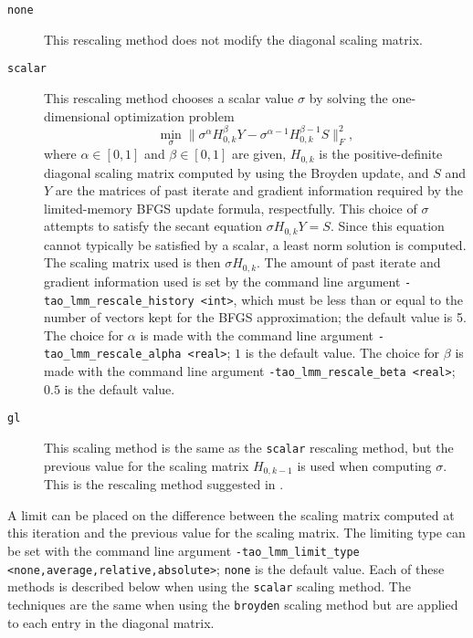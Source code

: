 \begin{description}
\item[{\tt none}] This rescaling method does not modify the diagonal scaling
matrix.
\item[{\tt scalar}] This rescaling method chooses a scalar value $\sigma$ by 
solving the one-dimensional optimization problem
\[
\min_\sigma \|\sigma^\alpha H_{0,k}^{\beta} Y - \sigma^{\alpha - 1} H_{0,k}^{\beta - 1} S\|_F^2,
\]
where $\alpha \in [0,1]$ and $\beta \in [0,1]$ are given, $H_{0,k}$ is the 
positive-definite diagonal scaling matrix computed by using the Broyden 
update, and $S$ and $Y$ are the matrices of past iterate and gradient
information required by the limited-memory BFGS update formula, respectfully.
This 
choice of $\sigma$ attempts to satisfy the secant equation 
$\sigma H_{0,k} Y = S$.  Since this equation cannot typically be satisfied 
by a scalar, a least norm solution is computed.  The scaling matrix used is 
then $\sigma H_{0,k}$.  The amount of past iterate and gradient information 
used is set by the command line argument 
{\tt -tao\_lmm\_rescale\_history <int>}, which must be less than or equal
to the number of vectors kept for the BFGS approximation; the default value 
is 5.  The choice for $\alpha$ is made with the command
line argument {\tt -tao\_lmm\_rescale\_alpha <real>}; $1$ is the default
value.  The choice for $\beta$ is made with the command line argument 
{\tt -tao\_lmm\_rescale\_beta <real>}; $0.5$ is the default value.
\item[{\tt gl}] This scaling method is the same as the {\tt scalar} rescaling 
method, but the previous value for the scaling matrix $H_{0,k-1}$ is used when 
computing $\sigma$.  This is the rescaling method suggested in 
\cite{Gilbert-Lemarechal}.
\end{description}

A limit can be placed on the difference between the scaling
matrix computed at this iteration and the previous value for the
scaling matrix.  The limiting type can be set with the command line 
argument {\tt -tao\_lmm\_limit\_type <none,average,relative,absolute>};
{\tt none} is the default value.  Each of these methods is described 
below when using the {\tt scalar} scaling method.  The techniques are
the same when using the {\tt broyden} scaling method but are applied
to each entry in the diagonal matrix.

